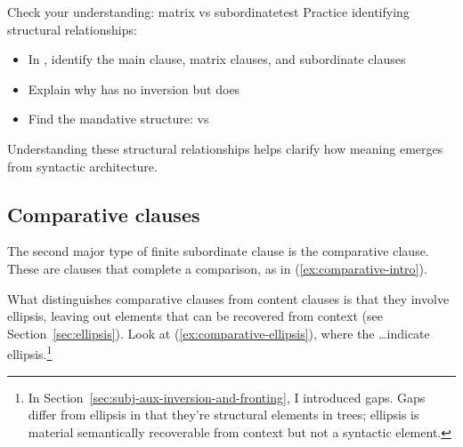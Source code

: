 \begin{tblsframedsymbol}{Check your understanding: matrix vs subordinate}{test}
Practice identifying structural relationships:
\begin{itemize}[noitemsep, leftmargin=*]
    \item In , identify the main clause, matrix clauses, and subordinate clauses
    \item Explain why  has no inversion but  does
    \item Find the mandative structure:  vs 
\end{itemize}
Understanding these structural relationships helps clarify how meaning emerges from syntactic architecture.
\end{tblsframedsymbol}


\subsection{Comparative clauses}

The second major type of finite subordinate clause is the comparative clause. These are clauses that complete a comparison, as in (\ref{ex:comparative-intro}).

\ea \label{ex:comparative-intro}
    \z
\z
What distinguishes comparative clauses from content clauses is that they involve ellipsis, leaving out elements that can be recovered from context (see Section~\ref{sec:ellipsis}). Look at (\ref{ex:comparative-ellipsis}), where the \dots indicate ellipsis.\footnote{In Section~\ref{sec:subj-aux-inversion-and-fronting}, I introduced gaps. Gaps differ from ellipsis in that they're structural elements in trees; ellipsis is material semantically recoverable from context but not a syntactic element.}

\ea \label{ex:comparative-ellipsis}
    \z
\z
{}

